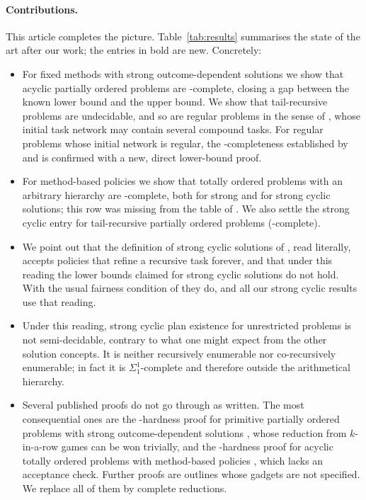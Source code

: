 \paragraph{Contributions.}
This article completes the picture. Table~\ref{tab:results} summarises the state of the art
after our work; the entries in bold are new. Concretely:

\begin{itemize}
  \item For fixed methods with strong outcome-dependent solutions we show that acyclic
    partially ordered problems are \EXPSPACE-complete, closing a gap between the known
    \NEXPTIME{} lower bound and the \EXPSPACE{} upper bound. We show that tail-recursive problems
    are undecidable, and so are regular problems in the sense of \textcite{bercher:et:al:ijcai-19},
    whose initial task network may contain several compound tasks. For regular problems whose
    initial network is regular, the \EXPSPACE-completeness established by \CBa{} and \DB{} is
    confirmed with a new, direct lower-bound proof.
  \item For method-based policies we show that totally ordered problems with an arbitrary
    hierarchy are \TWOEXP-complete, both for strong and for strong cyclic solutions; this row
    was missing from the table of \CBb{}. We also settle the strong cyclic entry for
    tail-recursive partially ordered problems (\TWOEXP-complete).
  \item We point out that the definition of strong cyclic solutions of \CBb{}, read literally,
    accepts policies that refine a recursive task forever, and that under this reading the
    lower bounds claimed for strong cyclic solutions do not hold. With the usual fairness
    condition of \textcite{cimatti:et:al:aij-03} they do, and all our strong cyclic results use
    that reading.
  \item Under this reading, strong cyclic plan existence for unrestricted problems is not
    semi-decidable, contrary to what one might expect from the other solution concepts. It is
    neither recursively enumerable nor co-recursively enumerable; in fact it is
    $\Sigma^1_1$-complete and therefore outside the arithmetical hierarchy.
  \item Several published proofs do not go through as written. The most consequential ones are
    the \PSPACE-hardness proof for primitive partially ordered problems with strong
    outcome-dependent solutions \parencite[Thm.~5.1]{chen:bercher:icaps-21}, whose reduction
    from $k$-in-a-row games can be won trivially, and the \EXPTIME-hardness proof for acyclic
    totally ordered problems with method-based policies
    \parencite[Thm.~1]{chen:bercher:icaps-22}, which lacks an acceptance check. Further proofs
    are outlines whose gadgets are not specified. We replace all of them by complete
    reductions.
\end{itemize}

